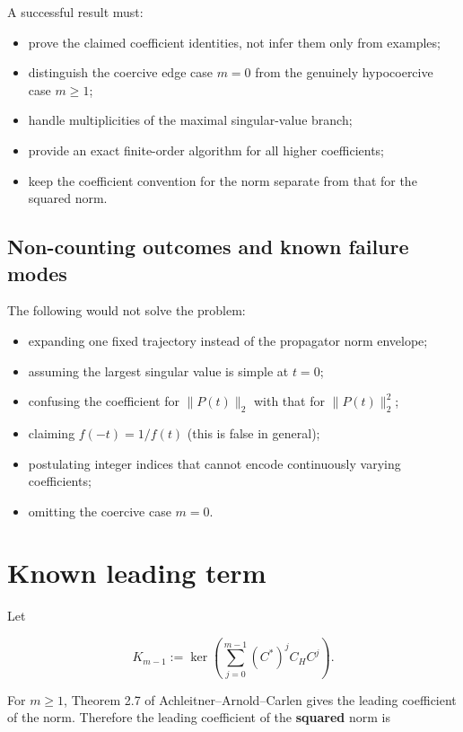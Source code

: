 \documentclass[11pt,a4paper]{article}
\providecommand{\tightlist}{%
  \setlength{\itemsep}{0pt}\setlength{\parskip}{0pt}}
\begin{document}
A successful result must:

\begin{itemize}
\tightlist
\item
  prove the claimed coefficient identities, not infer them only from examples;
\item
  distinguish the coercive edge case \(m=0\) from the genuinely hypocoercive case \(m\ge 1\);
\item
  handle multiplicities of the maximal singular-value branch;
\item
  provide an exact finite-order algorithm for all higher coefficients;
\item
  keep the coefficient convention for the norm separate from that for the squared norm.
\end{itemize}

\subsection{Non-counting outcomes and known failure modes}\label{non-counting-outcomes-and-known-failure-modes}

The following would not solve the problem:

\begin{itemize}
\tightlist
\item
  expanding one fixed trajectory instead of the propagator norm envelope;
\item
  assuming the largest singular value is simple at \(t=0\);
\item
  confusing the coefficient for \(\lVert P(t)\rVert_2\) with that for \(\lVert P(t)\rVert_2^2\);
\item
  claiming \(f(-t)=1/f(t)\) (this is false in general);
\item
  postulating integer indices that cannot encode continuously varying coefficients;
\item
  omitting the coercive case \(m=0\).
\end{itemize}

\section{Known leading term}\label{known-leading-term}

Let

\[
K_{m-1}:=\ker\!\left(\sum_{j=0}^{m-1}(C^*)^j C_H C^j\right).
\]

For \(m\ge 1\), Theorem 2.7 of Achleitner--Arnold--Carlen gives the leading coefficient of the norm. Therefore the leading coefficient of the \textbf{squared} norm is
\end{document}
